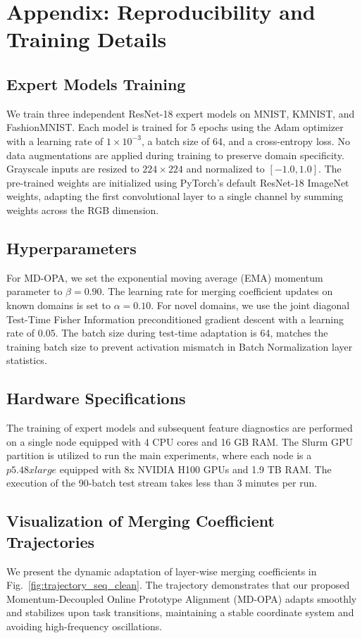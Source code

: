 \documentclass{article}
\theoremstyle{plain}
\theoremstyle{definition}
\theoremstyle{remark}
\begin{document}



\clearpage
\appendix
\section{Appendix: Reproducibility and Training Details}

\subsection{Expert Models Training}
We train three independent ResNet-18 expert models on MNIST, KMNIST, and FashionMNIST. Each model is trained for 5 epochs using the Adam optimizer with a learning rate of $1 \times 10^{-3}$, a batch size of 64, and a cross-entropy loss. No data augmentations are applied during training to preserve domain specificity. Grayscale inputs are resized to $224 \times 224$ and normalized to $[-1.0, 1.0]$. The pre-trained weights are initialized using PyTorch's default ResNet-18 ImageNet weights, adapting the first convolutional layer to a single channel by summing weights across the RGB dimension.

\subsection{Hyperparameters}
For MD-OPA, we set the exponential moving average (EMA) momentum parameter to $\beta = 0.90$. The learning rate for merging coefficient updates on known domains is set to $\alpha = 0.10$. For novel domains, we use the joint diagonal Test-Time Fisher Information preconditioned gradient descent with a learning rate of $0.05$. The batch size during test-time adaptation is 64, matches the training batch size to prevent activation mismatch in Batch Normalization layer statistics.

\subsection{Hardware Specifications}
The training of expert models and subsequent feature diagnostics are performed on a single node equipped with 4 CPU cores and 16 GB RAM. The Slurm GPU partition is utilized to run the main experiments, where each node is a $p5.48xlarge$ equipped with 8x NVIDIA H100 GPUs and 1.9 TB RAM. The execution of the 90-batch test stream takes less than 3 minutes per run.

\subsection{Visualization of Merging Coefficient Trajectories}
We present the dynamic adaptation of layer-wise merging coefficients in Fig.~\ref{fig:trajectory_seq_clean}. The trajectory demonstrates that our proposed Momentum-Decoupled Online Prototype Alignment (MD-OPA) adapts smoothly and stabilizes upon task transitions, maintaining a stable coordinate system and avoiding high-frequency oscillations.
\end{document}
